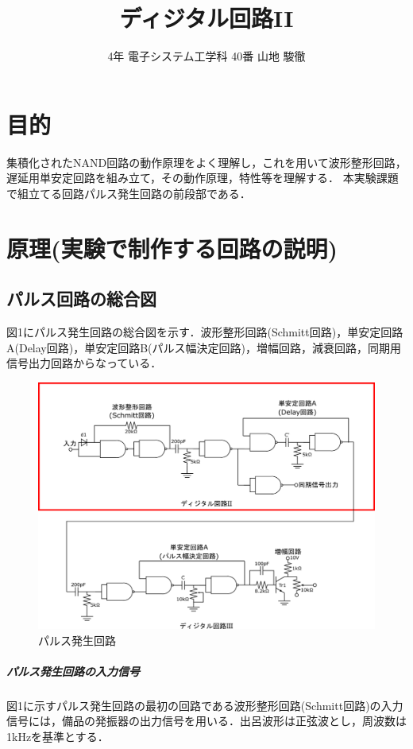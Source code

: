 \documentclass[10pt, a4j, dvipdfmx]{jarticle}
\title{ディジタル回路II}
\author{4年 電子システム工学科 40番  山地 駿徹}
\begin{document}
\section{目的}
集積化されたNAND回路の動作原理をよく理解し，これを用いて波形整形回路，遅延用単安定回路を組み立て，その動作原理，特性等を理解する．
本実験課題で組立てる回路パルス発生回路の前段部である．


\section{原理(実験で制作する回路の説明)}

\subsection{パルス回路の総合図}
図1にパルス発生回路の総合図を示す．波形整形回路(Schmitt回路)，単安定回路A(Delay回路)，単安定回路B(パルス幅決定回路)，増幅回路，減衰回路，同期用信号出力回路からなっている．
\begin{figure}[H]
	\centering
	\includegraphics[width=\hsize]{images/text/fig1.png}
	\caption{パルス発生回路}
\end{figure}
\subparagraph{パルス発生回路の入力信号}
図1に示すパルス発生回路の最初の回路である波形整形回路(Schmitt回路)の入力信号には，備品の発振器の出力信号を用いる．出呂波形は正弦波とし，周波数は1kHzを基準とする．
\end{document}

